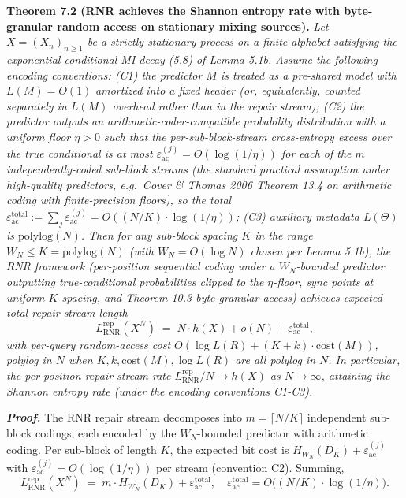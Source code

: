 \documentclass[
]{article}
\begin{document}
\textbf{Theorem 7.2 (RNR achieves the Shannon entropy rate with
byte-granular random access on stationary mixing sources).}
\emph{Let $X = (X_n)_{n \geq 1}$ be a strictly stationary process on
a finite alphabet satisfying the exponential conditional-MI decay
(5.8) of Lemma 5.1b. Assume the following encoding conventions:
(C1) the predictor $M$ is treated as a pre-shared model with}
$L(M) = O(1)$ \emph{amortized into a fixed header (or, equivalently,
counted separately in $L(M)$ overhead rather than in the repair
stream); (C2) the predictor outputs an arithmetic-coder-compatible
probability distribution with a uniform floor $\eta > 0$ such that
the per-sub-block-stream cross-entropy excess over the true conditional
is at most $\varepsilon_{\mathrm{ac}}^{(j)} = O(\log(1/\eta))$ for each
of the $m$ independently-coded sub-block streams (the standard practical
assumption under high-quality predictors, e.g.\ Cover \& Thomas 2006
Theorem 13.4 on arithmetic coding with finite-precision floors), so the
total $\varepsilon_{\mathrm{ac}}^{\mathrm{total}} := \sum_j \varepsilon_{\mathrm{ac}}^{(j)}
= O((N/K) \cdot \log(1/\eta))$; (C3) auxiliary metadata $L(\Theta)$ is $\mathrm{polylog}(N)$.
Then for any sub-block spacing $K$ in the range
$W_N \leq K = \mathrm{polylog}(N)$ (with
$W_N = O(\log N)$ chosen per Lemma 5.1b), the RNR framework
(per-position sequential coding under a $W_N$-bounded predictor
outputting true-conditional probabilities clipped to the $\eta$-floor,
sync points at uniform $K$-spacing, and Theorem 10.3 byte-granular
access) achieves expected total repair-stream length}
\[
L^{\mathrm{rep}}_{\mathrm{RNR}}(X^N) \;=\; N \cdot h(X) + o(N) + \varepsilon_{\mathrm{ac}}^{\mathrm{total}},
\]
\emph{with per-query random-access cost $O(\log L(R) + (K + k) \cdot
\mathrm{cost}(M))$, polylog in $N$ when $K, k, \mathrm{cost}(M),
\log L(R)$ are all polylog in $N$. In particular, the per-position
repair-stream rate $L^{\mathrm{rep}}_{\mathrm{RNR}}/N \to h(X)$ as
$N \to \infty$, attaining the Shannon entropy rate (under the
encoding conventions C1-C3).}

\emph{\textbf{Proof.}} The RNR repair stream decomposes into
$m = \lceil N/K \rceil$ independent sub-block codings, each encoded
by the $W_N$-bounded predictor with arithmetic coding. Per sub-block
of length $K$, the expected bit cost is $H_{W_N}(D_K) +
\varepsilon_{\mathrm{ac}}^{(j)}$ with
$\varepsilon_{\mathrm{ac}}^{(j)} = O(\log(1/\eta))$ per stream
(convention C2). Summing,
\[
L^{\mathrm{rep}}_{\mathrm{RNR}}(X^N)
\;=\;
m \cdot H_{W_N}(D_K) + \varepsilon_{\mathrm{ac}}^{\mathrm{total}},
\quad
\varepsilon_{\mathrm{ac}}^{\mathrm{total}} = O\bigl((N/K) \cdot \log(1/\eta)\bigr).
\]
\end{document}
